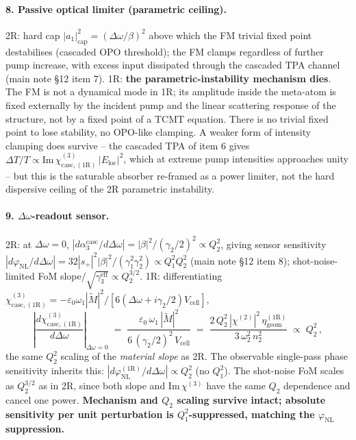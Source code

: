 \documentclass[11pt,a4paper]{article}
\newcommand{\eps}{\varepsilon}
\newcommand{\chitwo}{\chi^{(2)}}
\newcommand{\chithree}{\chi^{(3)}}
\newcommand{\Dom}{\Delta\omega}
\newcommand{\chicascOneR}{\chi^{(3)}_{\text{casc},(1\mathrm R)}}
\newcommand{\Vunit}{V_{\text{cell}}}
\begin{document}
\paragraph{8. Passive optical limiter (parametric ceiling).}
2R: hard cap $|a_1|^{2}_\text{cap}=(\Dom/\beta)^{2}$ above which the FM
trivial fixed point destabilises (cascaded OPO threshold); the FM clamps
regardless of further pump increase, with excess input dissipated through
the cascaded TPA channel (main note \S 12 item 7).
1R: \textbf{the parametric-instability mechanism dies}.  The FM is not a
dynamical mode in 1R; its amplitude inside the meta-atom is fixed
externally by the incident pump and the linear scattering response of the
structure, not by a fixed point of a TCMT equation.  There is no trivial
fixed point to lose stability, no OPO-like clamping.  A weaker form of
intensity clamping does survive -- the cascaded TPA of item 6 gives
$\Delta T/T\propto\mathrm{Im}\,\chicascOneR\,|E_\text{loc}|^{2}$, which
at extreme pump intensities approaches unity -- but this is the saturable
absorber re-framed as a power limiter, not the hard dispersive ceiling of
the 2R parametric instability.

\paragraph{9. \texorpdfstring{$\Dom$}{Δω}-readout sensor.}
2R: at $\Dom=0$,
$|d\alpha_3^\text{casc}/d\Dom|=|\beta|^{2}/(\gamma_2/2)^{2}\propto Q_2^{2}$,
giving sensor sensitivity
$|d\varphi_\text{NL}/d\Dom|=32|s_+|^{2}|\beta|^{2}/(\gamma_1^{2}\gamma_2^{2})\propto Q_1^{2}Q_2^{2}$
(main note \S 12 item 8); shot-noise-limited FoM
slope$/\sqrt{\gamma_3^\text{eff}}\propto Q_2^{3/2}$.
1R: differentiating $\chicascOneR=-\eps_0\omega_1|\widetilde M|^{2}/[6(\Dom+i\gamma_2/2)\Vunit]$,
\begin{equation}
  \left|\frac{d\chicascOneR}{d\Dom}\right|_{\Dom=0}
   \;=\;\frac{\eps_0\,\omega_1\,|\widetilde M|^{2}}{6\,(\gamma_2/2)^{2}\,\Vunit}
   \;=\;\frac{2\,Q_2^{2}\,|\chitwo|^{2}\,\eta_\text{geom}^{(1\mathrm R)}}
              {3\,\omega_2^{2}\,n_2^{2}}
   \;\propto\;Q_2^{2}\,,
  \label{eq:sensor-1R-slope}
\end{equation}
the same $Q_2^{2}$ scaling of the \emph{material slope} as 2R.  The
observable single-pass phase sensitivity inherits this:
$|d\varphi_\text{NL}^{(1\mathrm R)}/d\Dom|\propto Q_2^{2}$ (no $Q_1^{2}$).
The shot-noise FoM scales as $Q_2^{3/2}$ as in 2R, since both slope and
$\mathrm{Im}\,\chithree$ have the same $Q_2$ dependence and cancel one
power.  \textbf{Mechanism and $Q_2$ scaling survive intact;
absolute sensitivity per unit perturbation is $Q_1^{2}$-suppressed,
matching the $\varphi_\text{NL}$ suppression.}
\end{document}
